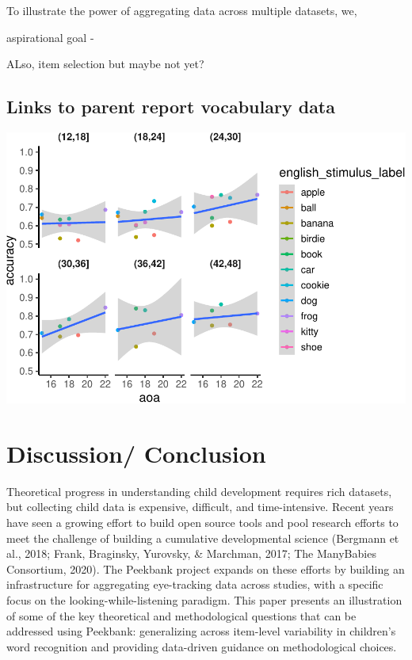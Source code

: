\documentclass[
  english,
  man,floatsintext]{apa6}
\begin{document}
To illustrate the power of aggregating data across multiple datasets, we,

aspirational goal -

ALso, item selection but maybe not yet?

\hypertarget{links-to-parent-report-vocabulary-data}{%
\subsection{Links to parent report vocabulary data}\label{links-to-parent-report-vocabulary-data}}

\includegraphics{peekbank-brm_files/figure-latex/aoas-1.pdf}

\hypertarget{discussion-conclusion}{%
\section{Discussion/ Conclusion}\label{discussion-conclusion}}

Theoretical progress in understanding child development requires rich datasets, but collecting child data is expensive, difficult, and time-intensive.
Recent years have seen a growing effort to build open source tools and pool research efforts to meet the challenge of building a cumulative developmental science (Bergmann et al., 2018; Frank, Braginsky, Yurovsky, \& Marchman, 2017; The ManyBabies Consortium, 2020).
The Peekbank project expands on these efforts by building an infrastructure for aggregating eye-tracking data across studies, with a specific focus on the looking-while-listening paradigm.
This paper presents an illustration of some of the key theoretical and methodological questions that can be addressed using Peekbank: generalizing across item-level variability in children's word recognition and providing data-driven guidance on methodological choices.
\end{document}
